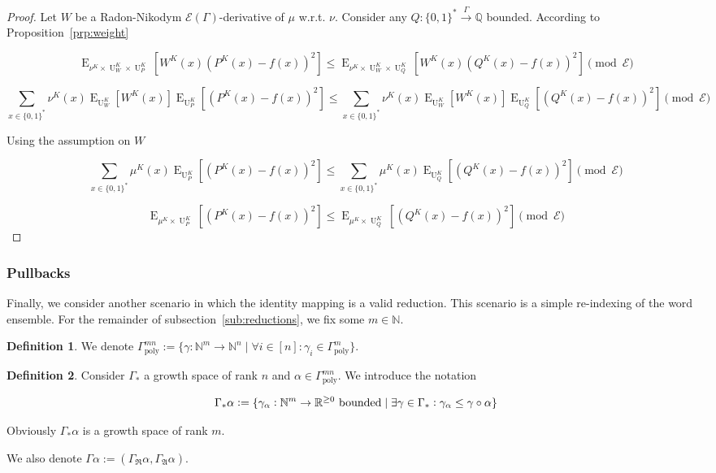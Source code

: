 \documentclass{article}
\numberwithin{equation}{section}
\theoremstyle{definition}
\newtheorem{definition}{Definition}[section]
\theoremstyle{plain}
\newcommand{\Bool}{\{0,1\}}
\newcommand{\Words}{{\Bool^*}}
\DeclareMathOperator{\E}{E}
\DeclareMathOperator{\Un}{U}
\newcommand{\Nats}{\mathbb{N}}
\newcommand{\Rats}{\mathbb{Q}}
\newcommand{\Reals}{\mathbb{R}}
\newcommand{\GrowR}{\Gamma_{\mathfrak{R}}}
\newcommand{\GrowA}{\Gamma_{\mathfrak{A}}}
\newcommand{\Fall}{\mathcal{E}}
\newcommand{\EG}{\Fall(\Gamma)}
\newcommand{\Scheme}{\xrightarrow{\Gamma}}
\begin{document}
\begin{proof}

Let ${W}$ be a Radon-Nikodym ${\EG}$-derivative of ${\mu}$ w.r.t. ${\nu}$. Consider any ${Q: \Words \Scheme \Rats}$ bounded. According to Proposition~\ref{prp:weight}

\[\E_{\nu^{K} \times \Un_W^K \times \Un_P^K}[W^K(x)(P^K(x)-f(x))^2] \leq \E_{\nu^{K} \times \Un_W^K \times \Un_Q^K}[W^K(x)(Q^K(x)-f(x))^2] \pmod \Fall\]

\[\sum_{x \in \Words} \nu^{K}(x) \E_{\Un_W^K}[W^K(x)] \E_{\Un_P^K}[(P^K(x)-f(x))^2] \leq \sum_{x \in \Words} \nu^{K}(x) \E_{\Un_W^K}[W^K(x)] \E_{\Un_Q^K}[(Q^K(x)-f(x))^2] \pmod \Fall\]

Using the assumption on ${W}$

\[\sum_{x \in \Words} \mu^{K}(x) \E_{\Un_P^K}[(P^K(x)-f(x))^2] \leq \sum_{x \in \Words} \mu^{K}(x) \E_{\Un_Q^K}[(Q^K(x)-f(x))^2] \pmod \Fall\]

\[\E_{\mu^{K} \times \Un_P^K}[(P^K(x)-f(x))^2] \leq \E_{\mu^{K} \times \Un_Q^K}[(Q^K(x)-f(x))^2] \pmod \Fall\]
%
\end{proof}

\subsubsection{Pullbacks}

Finally, we consider another scenario in which the identity mapping is a valid reduction. This scenario is a simple re-indexing of the word ensemble. For the remainder of subsection~\ref{sub:reductions}, we fix some ${m \in \Nats}$.

\begin{samepage}
\begin{definition}

We denote ${\Gamma_{\text{poly}}^{mn}:=\{\gamma: \Nats^m \rightarrow \Nats^n \mid \forall i \in [n]: \gamma_i \in \Gamma_{\text{poly}}^m \}}$.

\end{definition}
\end{samepage}

\begin{samepage}
\begin{definition}

Consider ${\Gamma_*}$ a growth space of rank ${n}$ and ${\alpha \in \Gamma_{\text{poly}}^{mn}}$. We introduce the notation

\begin{equation}
\label{eqn:tbd}
\Gamma_*\alpha:=\{\gamma_\alpha: \Nats^m \rightarrow \Reals^{\geq 0} \textnormal{ bounded} \mid \exists \gamma \in \Gamma_*: \gamma_\alpha \leq \gamma \circ \alpha\}
\end{equation}

Obviously ${\Gamma_*\alpha}$ is a growth space of rank ${m}$.

We also denote ${\Gamma \alpha := (\GrowR \alpha, \GrowA \alpha)}$.

\end{definition}
\end{samepage}
\end{document}
